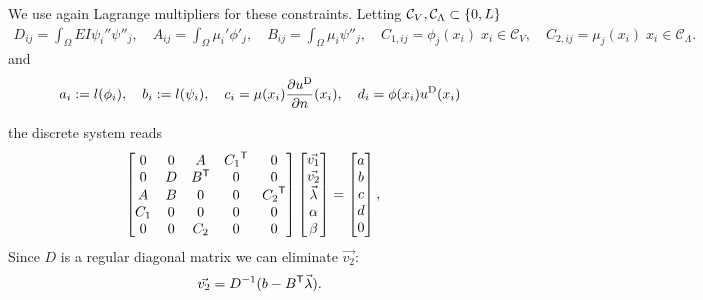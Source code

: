 %
We use again Lagrange multipliers for these constraints. Letting $\mathcal C_V,\mathcal C_{\Lambda}\subset\left\{0,L\right\}$
%
\begin{align*}
D_{ij} = \int_{\Omega} EI\psi_i''\psi''_j,\quad
A_{ij} = \int_{\Omega} \mu_i'\phi'_j,\quad
B_{ij} = \int_{\Omega} \mu_i\psi''_j,\quad
C_{1,ij} = \phi_j(x_i)\; x_i\in\mathcal C_V,\quad
C_{2,ij} = \mu_j(x_i)\; x_i\in\mathcal C_{\Lambda}.
\end{align*}
%
and
%
\begin{align*}
a_i := l(\phi_i), \quad b_i:=l(\psi_i),\quad  c_i = \mu(x_i)\frac{\partial u^{\rm D}}{\partial n}(x_i),\quad d_i = \phi(x_i)u^{\rm D}(x_i)
\end{align*}
%

the discrete system reads
%
\begin{equation}\label{eq:}
\begin{bmatrix}
0 & 0 & A& {C_1}^{\mathsf{T}}&0\\
0 & D & {B}^{\mathsf{T}}& 0&0\\
A & B & 0 & 0&{C_2}^{\mathsf{T}}\\
C_1 & 0 & 0 & 0&0\\
0 & 0 & C_2 & 0&0\\
\end{bmatrix}
\begin{bmatrix}
\vec{v_1} \\ \vec{v_2} \\ \vec{\lambda}\\ \alpha \\ \beta
\end{bmatrix}
=
\begin{bmatrix}
a \\ b \\ c\\ d\\0
\end{bmatrix},\quad
\end{equation}
%
%
Since $D$ is a regular diagonal matrix we can eliminate $\vec{v_2}$:
%
\begin{align*}
\vec{v_2} = D^{-1}(b-{B}^{\mathsf{T}}\vec{\lambda}).
\end{align*}
%

